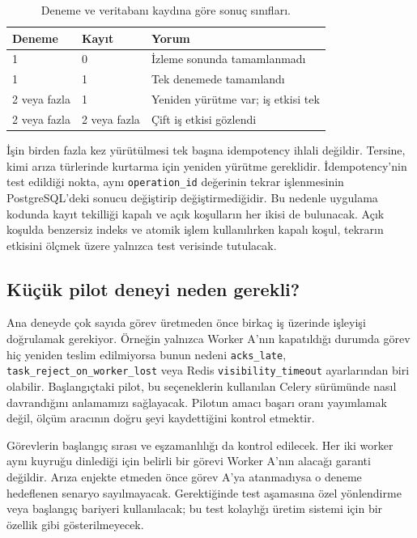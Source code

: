 \documentclass[conference,a4paper]{IEEEtran}
\newcommand{\code}[1]{\texttt{#1}}
\begin{document}
\begin{table}[t]
\caption{Deneme ve veritabanı kaydına göre sonuç sınıfları.}
\centering\footnotesize
\begin{tabularx}{\columnwidth}{@{}p{15mm}p{15mm}X@{}}
\toprule
Deneme & Kayıt & Yorum\\
\midrule
1 & 0 & İzleme sonunda tamamlanmadı\\
1 & 1 & Tek denemede tamamlandı\\
2 veya fazla & 1 & Yeniden yürütme var; iş etkisi tek\\
2 veya fazla & 2 veya fazla & Çift iş etkisi gözlendi\\
\bottomrule
\end{tabularx}
\label{tab:decision}
\end{table}

İşin birden fazla kez yürütülmesi tek başına idempotency ihlali değildir. Tersine, kimi arıza türlerinde kurtarma için yeniden yürütme gereklidir. İdempotency'nin test edildiği nokta, aynı \code{operation\_id} değerinin tekrar işlenmesinin PostgreSQL'deki sonucu değiştirip değiştirmediğidir. Bu nedenle uygulama kodunda kayıt tekilliği kapalı ve açık koşulların her ikisi de bulunacak. Açık koşulda benzersiz indeks ve atomik işlem kullanılırken kapalı koşul, tekrarın etkisini ölçmek üzere yalnızca test verisinde tutulacak.

\subsection{Küçük pilot deneyi neden gerekli?}
Ana deneyde çok sayıda görev üretmeden önce birkaç iş üzerinde işleyişi doğrulamak gerekiyor. Örneğin yalnızca Worker A'nın kapatıldığı durumda görev hiç yeniden teslim edilmiyorsa bunun nedeni \code{acks\_late}, \code{task\_reject\_on\_worker\_lost} veya Redis \code{visibility\_timeout} ayarlarından biri olabilir. Başlangıçtaki pilot, bu seçeneklerin kullanılan Celery sürümünde nasıl davrandığını anlamamızı sağlayacak. Pilotun amacı başarı oranı yayımlamak değil, ölçüm aracının doğru şeyi kaydettiğini kontrol etmektir.

Görevlerin başlangıç sırası ve eşzamanlılığı da kontrol edilecek. Her iki worker aynı kuyruğu dinlediği için belirli bir görevi Worker A'nın alacağı garanti değildir. Arıza enjekte etmeden önce görev A'ya atanmadıysa o deneme hedeflenen senaryo sayılmayacak. Gerektiğinde test aşamasına özel yönlendirme veya başlangıç bariyeri kullanılacak; bu test kolaylığı üretim sistemi için bir özellik gibi gösterilmeyecek.
\end{document}
